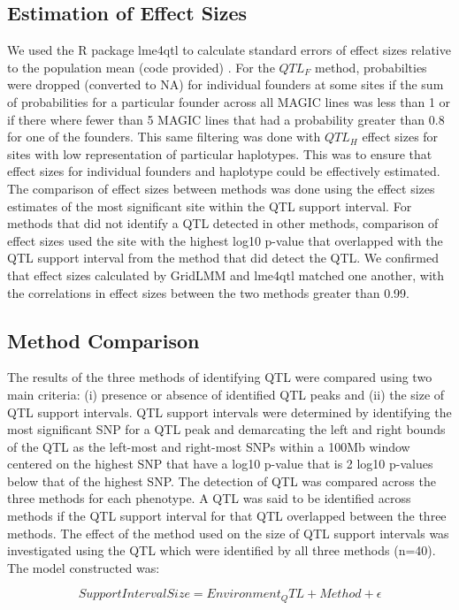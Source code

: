 \documentclass[article,9pt,twocolumn,twoside]{rilabRxiv}
\begin{document}
\subsection{Estimation of Effect Sizes}
We used the R package lme4qtl to calculate standard errors of effect sizes relative to the population mean (code provided) \cite{Ziyatdinov}.
For the $QTL_F$ method, probabilties were dropped (converted to NA) for individual founders at some sites if the sum of probabilities for a particular founder across all MAGIC lines was less than 1 or if there where fewer than 5 MAGIC lines that had a probability greater than 0.8 for one of the founders.
This same filtering was done with $QTL_H$ effect sizes for sites with low representation of particular haplotypes.
This was to ensure that effect sizes for individual founders and haplotype could be effectively estimated.
The comparison of effect sizes between methods was done using the effect sizes estimates of the most significant site within the QTL support interval.
For methods that did not identify a QTL detected in other methods, comparison of effect sizes used the site with the highest log10 p-value that overlapped with the QTL support interval from the method that did detect the QTL.
We confirmed that effect sizes calculated by GridLMM and lme4qtl matched one another, with the correlations in effect sizes between the two methods greater than 0.99.

\subsection{Method Comparison}
The results of the three methods of identifying QTL were compared using two main criteria: (i) presence or absence of identified QTL peaks and (ii) the size of QTL support intervals.
QTL support intervals were determined by identifying the most significant SNP for a QTL peak and demarcating the left and right bounds of the QTL as the left-most and right-most SNPs within a 100Mb window centered on the highest SNP that have a log10 p-value that is 2 log10 p-values below that of the highest SNP.
The detection of QTL was compared across the three methods for each phenotype.
A QTL was said to be identified across methods if the QTL support interval for that QTL overlapped between the three methods.
The effect of the method used on the size of QTL support intervals was investigated using the QTL which were identified by all three methods (n=40). The model constructed was:

\begin{equation}
\label{eqn:bounds}
 Support Interval Size = Environment_QTL + Method + \epsilon
\end{equation}
\end{document}
